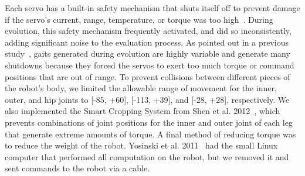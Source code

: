 Each servo has a built-in safety mechanism that shuts itself off to prevent damage if the servo's current, range, temperature, or torque was too high~\cite{robotis}. During evolution, this safety mechanism frequently activated, and did so inconsistently, adding significant noise to the evaluation process. As pointed out in a previous study~\cite{yos:clune}, gaits generated during evolution are highly variable and generate many shutdowns because they forced the servos to exert too much torque or command positions that are out of range. %
To prevent collisions between different pieces of the robot's body, we limited the allowable range of movement for the inner, outer, and hip joints to [-85\degree, +60\degree], [-113\degree, +39\degree], and [-28\degree, +28\degree], respectively. We also implemented the Smart Cropping System from Shen et al. 2012~\cite{haocheng}, which prevents combinations of joint positions for the inner and outer joint of each leg that generate extreme amounts of torque. A final method of reducing torque was to reduce the weight of the robot. Yosinski et al. 2011~\cite{yos:clune} had the small Linux computer that performed all computation on the robot, but we removed it and sent commands to the robot via a cable. 
